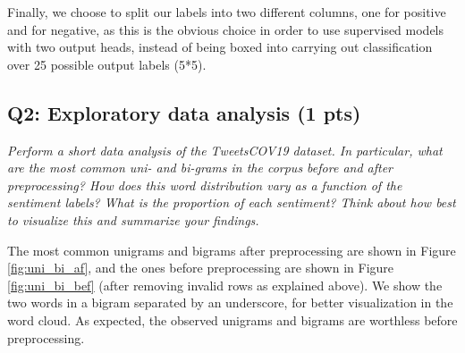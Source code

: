 Finally, we choose to split our labels into two different columns, one for positive and for negative, as this is the obvious choice in order to use supervised models with two output heads, instead of being boxed into carrying out classification over 25 possible output labels (5*5).


\subsection*{Q2: Exploratory data analysis (1 pts)}
\textit{Perform a short data analysis of the TweetsCOV19 dataset. In particular, what are the most common uni- and bi-grams in the corpus before and after preprocessing? How does this word distribution vary as a function of the sentiment labels? What is the proportion of each sentiment? Think about how best to visualize this and summarize your findings.}

The most common unigrams and bigrams after preprocessing are shown in Figure \ref{fig:uni_bi_af}, and the ones before preprocessing are shown in Figure \ref{fig:uni_bi_bef} (after removing invalid rows as explained above). We show the two words in a bigram separated by an underscore, for better visualization in the word cloud. As expected, the observed unigrams and bigrams are worthless before preprocessing.

